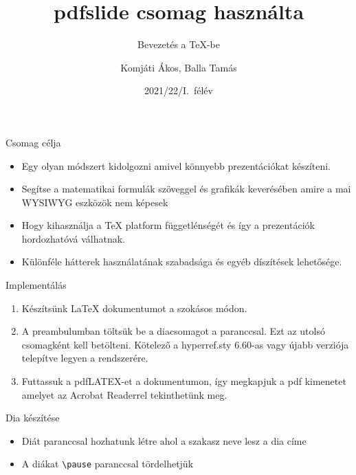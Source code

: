 \documentclass{beamer}
\begin{document}
\author{Komjáti Ákos, Balla Tamás}
\title{pdfslide csomag használta}
\subtitle{Bevezetés a \TeX-be}
\date{2021/22/I.\ félév}

\frame[plain]{\maketitle}
\begin{frame}{Csomag célja}
\begin{itemize}

\item Egy olyan módszert kidolgozni amivel könnyebb prezentációkat készíteni.\pause

\item Segítse a matematikai formulák szöveggel és grafikák keverésében amire a mai WYSIWYG eszközök nem képesek\pause

\item Hogy kihasználja a \TeX{} platform függetlénségét és így a prezentációk hordozhatóvá válhatnak.\pause

\item Különféle hátterek használatának szabadsága és egyéb díszítések lehetősége.

\end{itemize}
\end{frame}

\begin{frame}[fragile]{Implementálás}
\begin{enumerate}
\item Készítsünk \LaTeX{} dokumentumot a szokásos módon. \pause
\item A preambulumban töltsük be a diacsomagot a \color{red}{\verb|\usepackage{pdfslide}|}\color{black}paranccsal. Ezt az utolsó csomagként kell betölteni. Kötelező a hyperref.sty 6.60-as vagy újabb verziója telepítve legyen a rendszerére. \pause
\item Futtassuk a pdfLATEX-et a dokumentumon, így megkapjuk a pdf kimenetet
amelyet az Acrobat Readerrel tekinthetünk meg.
 
\end{enumerate}
\end{frame}

\begin{frame}[fragile]{Dia készítése}
\begin{itemize}
\item 
Diát  \color{black} paranccsal hozhatunk létre ahol a szakasz neve lesz a dia címe
\pause
\item A diákat  \color{red}\verb|\pause| \color{black}paranccsal tördelhetjük  
\end{itemize}
\end{frame}
\end{document}
